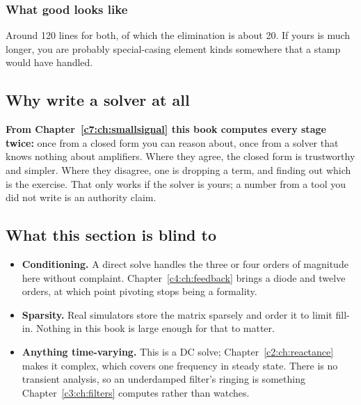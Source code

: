 \subsubsection{What good looks like}
Around 120 lines for both, of which the elimination is about 20. If yours is much longer, you are probably special-casing element kinds somewhere that a stamp would have handled.

\subsection{Why write a solver at all}
\label{c1:sec:b6}
\textbf{From Chapter~\ref{c7:ch:smallsignal} this book computes every stage twice:} once from a closed form you can reason about, once from a solver that knows nothing about amplifiers. Where they agree, the closed form is trustworthy and simpler. Where they disagree, one is dropping a term, and finding out which is the exercise. That only works if the solver is yours; a number from a tool you did not write is an authority claim.

\subsection{What this section is blind to}
\label{c1:sec:b7}
\begin{itemize}
  \item \textbf{Conditioning.} A direct solve handles the three or four orders of magnitude here without complaint. Chapter~\ref{c4:ch:feedback} brings a diode and twelve orders, at which point pivoting stops being a formality.
  \item \textbf{Sparsity.} Real simulators store the matrix sparsely and order it to limit fill-in. Nothing in this book is large enough for that to matter.
  \item \textbf{Anything time-varying.} This is a DC solve; Chapter~\ref{c2:ch:reactance} makes it complex, which covers one frequency in steady state. There is no transient analysis, so an underdamped filter's ringing is something Chapter~\ref{c3:ch:filters} computes rather than watches.
\end{itemize}

